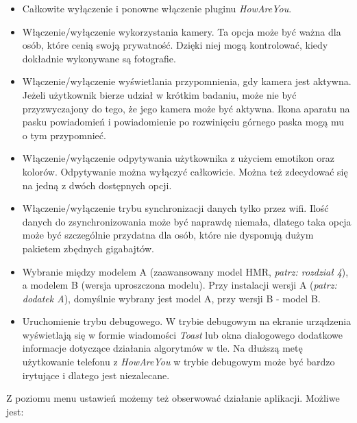 \begin{itemize}
	\item Całkowite wyłączenie i ponowne włączenie pluginu \textit{HowAreYou}.
	
	\item Włączenie/wyłączenie wykorzystania kamery. Ta opcja może być ważna dla osób, które cenią swoją prywatność. Dzięki niej mogą kontrolować, kiedy dokładnie wykonywane są fotografie.
	
	\item Włączenie/wyłączenie wyświetlania przypomnienia, gdy kamera jest aktywna. Jeżeli użytkownik bierze udział w krótkim badaniu, może nie być przyzwyczajony do tego, że jego kamera może być aktywna. Ikona aparatu na pasku powiadomień i powiadomienie po rozwinięciu górnego paska mogą mu o tym przypomnieć.
	
	\item Włączenie/wyłączenie odpytywania użytkownika z użyciem emotikon oraz kolorów. Odpytywanie można wyłączyć całkowicie. Można też zdecydować się na jedną z dwóch dostępnych opcji.
	
	\item Włączenie/wyłączenie trybu synchronizacji danych tylko przez wifi. Ilość danych do zsynchronizowania może być naprawdę niemała, dlatego taka opcja może być szczególnie przydatna dla osób, które nie dysponują dużym pakietem zbędnych gigabajtów.
	
	\item Wybranie między modelem A (zaawansowany model HMR, \textit{patrz: rozdział 4}), a modelem B (wersja uproszczona modelu). Przy instalacji wersji A (\textit{patrz: dodatek A}), domyślnie wybrany jest model A, przy wersji B - model B.
	
	\item Uruchomienie trybu debugowego. W trybie debugowym na ekranie urządzenia wyświetlają się w formie wiadomości \textit{Toast} lub okna dialogowego dodatkowe informacje dotyczące działania algorytmów w tle. Na dłuższą metę użytkowanie telefonu z \textit{HowAreYou} w trybie debugowym może być bardzo irytujące i dlatego jest niezalecane.
	
\end{itemize}

Z poziomu menu ustawień możemy też obserwować działanie aplikacji. Możliwe jest:

